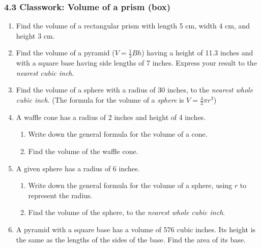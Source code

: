 

\fancyhead[LE]{\thepage}



\subsubsection*{4.3 Classwork: Volume of a prism (box)}
\begin{enumerate}
\item Find the volume of a rectangular prism with length 5 cm, width 4 cm, and height 3 cm. \vspace{1cm}

\item Find the volume of a pyramid ($V=\frac{1}{3}Bh$) having a height of 11.3 inches and with a square base having side lengths of 7 inches. Express your result to the \emph{nearest cubic inch}. \vspace{3cm}


\item Find the volume of a sphere with a radius of 30 inches, to the \emph{nearest whole cubic inch}. (The formula for the volume of a \emph{sphere} is $V=\frac{4}{3}\pi r^3$) \vspace{3cm}

\item A waffle cone has a radius of 2 inches and height of 4 inches. 
\begin{enumerate}
  \item Write down the general formula for the volume of a cone. \vspace{1cm}
  \item Find the volume of the waffle cone.
\end{enumerate}  \vspace{3cm}

\item A given sphere has a radius of 6 inches.
\begin{enumerate}
  \item Write down the general formula for the volume of a sphere, using $r$ to represent the radius. \vspace{1cm}
  \item Find the volume of the sphere, to the \emph{nearest whole cubic inch}.
\end{enumerate}  \vspace{3cm}

\item A pyramid with a square base has a volume of 576 cubic inches. Its height is the same as the lengths of the sides of the base. Find the area of its base.

\end{enumerate}
